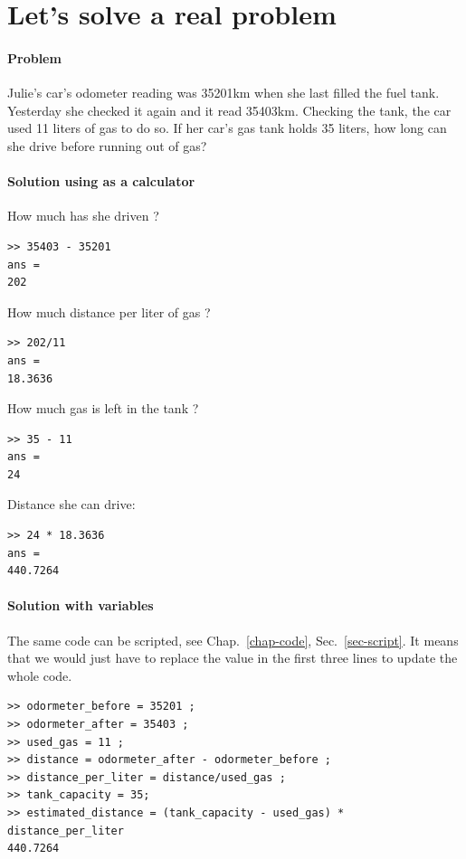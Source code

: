 \section{Let's solve a real problem}

	\paragraph*{Problem}
		\label{problem-julie}
		Julie's car's odometer reading was 35201km when she last filled the fuel tank. 
		Yesterday she checked it again and it read 35403km. Checking the tank, the car used 11 liters of gas to do so.
		If her car's gas tank holds 35 liters, how long can she drive before running out of gas? 

	\paragraph*{Solution using \matlab as a calculator}
		How much has she driven ?
\begin{lstlisting}
>> 35403 - 35201
ans =
202
\end{lstlisting}
		How much distance per liter of gas ?
\begin{lstlisting}
>> 202/11
ans =
18.3636
\end{lstlisting}
		How much gas is left in the tank ?
\begin{lstlisting}
>> 35 - 11
ans =
24
\end{lstlisting}
	Distance she can drive:
\begin{lstlisting}
>> 24 * 18.3636
ans =
440.7264
\end{lstlisting} 

	\paragraph*{Solution with variables}
	The same code can be scripted, see Chap.~\ref{chap-code}, Sec.~\ref{sec-script}. It means that we would just have to replace the value in the first three lines to update the whole code. 

\begin{lstlisting}
>> odormeter_before = 35201 ;
>> odormeter_after = 35403 ; 
>> used_gas = 11 ;
>> distance = odormeter_after - odormeter_before ;  
>> distance_per_liter = distance/used_gas ;
>> tank_capacity = 35;
>> estimated_distance = (tank_capacity - used_gas) * distance_per_liter
440.7264
\end{lstlisting}



